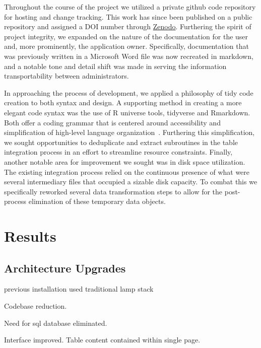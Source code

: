 \documentclass[10pt]{report}
\begin{document}
Throughout the course of the project we utilized a private github code repository for hosting and change tracking. This work has since been published on a public repository and assigned a DOI number through \href{https://zenodo.org/record/4422027}{Zenodo}. Furthering the spirit of project integrity, we expanded on the nature of the documentation for the user and, more prominently, the application owner. Specifically, documentation that was previously written in a Microsoft Word file was now recreated in markdown, and a notable tone and detail shift was made in serving the information transportability between administrators.

In approaching the process of development, we applied a philosophy of tidy code creation to both syntax and design. A supporting method in creating a more elegant code syntax was the use of R universe tools, tidyverse and Rmarkdown. Both offer a coding grammar that is centered around accessibility and simplification of high-level language organization~\cite{Wickham2019}. Furthering this simplification, we sought opportunities to deduplicate and extract subroutines in the table integration process in an effort to streamline resource constraints. Finally, another notable area for improvement we sought was in disk space utilization. The existing integration process relied on the continuous presence of what were several intermediary files that occupied a sizable disk capacity. To combat this we specifically reworked several data transformation steps to allow for the post-process elimination of these temporary data objects.

\section{Results}

\subsection{Architecture Upgrades}
previous installation used traditional lamp stack

Codebase reduction.

Need for sql database eliminated.

Interface improved. Table content contained within single page.
\end{document}
